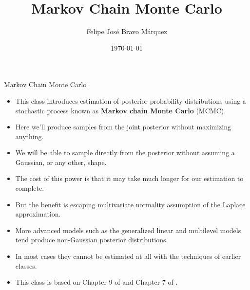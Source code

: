 \documentclass[handout]{beamer}
\title{Markov Chain Monte Carlo}
\author[Felipe Bravo Márquez]{\footnotesize
 \textcolor[rgb]{0.00,0.00,1.00}{Felipe José Bravo Márquez}}
\date{ \today }
\begin{document}
\begin{frame}
\titlepage


\end{frame}




\begin{frame}{Markov Chain Monte Carlo}
\scriptsize{
\begin{itemize}
\item This class  introduces estimation of posterior probability distributions using a stochastic process known
as \textbf{Markov chain Monte Carlo} (MCMC). 

\item Here we'll produce samples from the joint posterior without maximizing anything. 

\item We will be able to sample directly from the posterior without assuming a Gaussian, or any other, shape. 

\item The cost of this power is that it may take much longer for our estimation to complete.

\item But the benefit is escaping multivariate normality assumption of the Laplace approximation.

\item More advanced models such as the generalized linear and multilevel models tend produce non-Gaussian posterior distributions.

\item In most cases  they cannot
be estimated at all with the techniques of earlier classes. 


\item This class is based on Chapter 9 of \cite{mcelreath2020statistical} and Chapter 7 of \cite{kruschke2014doing}.
 
\end{itemize}



} 

\end{frame}
\end{document}

